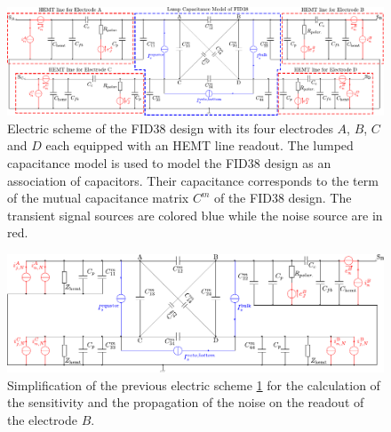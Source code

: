 \begin{landscape}

\begin{figure}
\centering
\includegraphics[scale=1]{Figures/Electrodes/fid38_full_circuit.pdf}
\caption{Electric scheme of the FID38 design with its four electrodes $A$, $B$, $C$ and $D$ each equipped with an HEMT line readout. The lumped capacitance model is used to model the FID38 design as an association of capacitors. Their capacitance corresponds to the term of the mutual capacitance matrix $C^m$ of the FID38 design. The transient signal sources are colored blue while the noise source are in red.}
\label{fig:fid38-full-circuit}
\end{figure}

\begin{figure}
\centering
\includegraphics[scale=1]{Figures/Electrodes/fid38_reduced_circuit.pdf}
\caption{Simplification of the previous electric scheme \ref{fig:fid38-full-circuit} for the calculation of the sensitivity and the propagation of the noise on the readout of the electrode $B$.}
\label{fig:fid38-reduced-circuit}
\end{figure}

\end{landscape}

